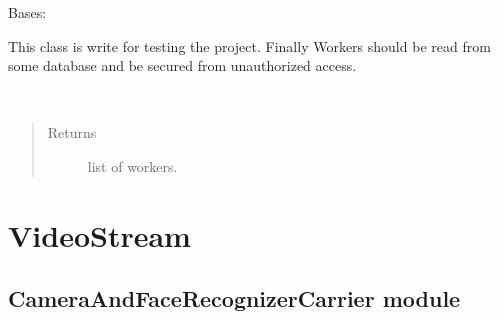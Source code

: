 \documentclass[letterpaper,10pt,english]{sphinxmanual}
\begin{document}
\begin{fulllineitems}
\label{\detokenize{doc/Access/Workers:Workers.Workers}}
Bases: 

This class is write for testing the project. Finally Workers should be read from some database and be secured
from unauthorized access.

\begin{fulllineitems}
\label{\detokenize{doc/Access/Workers:Workers.Workers.get_workers}}~\begin{quote}\begin{description}
\item[{Returns}] \leavevmode
list of workers.

\end{description}\end{quote}

\end{fulllineitems}


\end{fulllineitems}



\section{VideoStream}
\label{\detokenize{doc/VideoStream/modules:videostream}}\label{\detokenize{doc/VideoStream/modules::doc}}

\subsection{CameraAndFaceRecognizerCarrier module}
\label{\detokenize{doc/VideoStream/CameraAndFaceRecognizerCarrier:module-CameraAndFaceRecognizerCarrier}}\label{\detokenize{doc/VideoStream/CameraAndFaceRecognizerCarrier:cameraandfacerecognizercarrier-module}}\label{\detokenize{doc/VideoStream/CameraAndFaceRecognizerCarrier::doc}}
\end{document}
